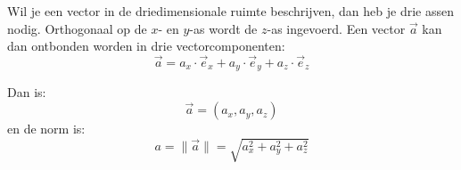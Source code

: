 \documentclass{ximera}
\begin{document}
\begin{remark}[expandable=true,title={Vectoren in drie dimensies}]\nl
    Wil je een vector in de driedimensionale ruimte beschrijven, dan heb je drie assen nodig. Orthogonaal op de $x$- en $y$-as wordt de $z$-as ingevoerd. Een vector $\vec{a}$ kan dan ontbonden worden in drie vectorcomponenten:
    \[ \vec{a} = a_{x} \cdot \vec{e}_{x} + a_{y} \cdot \vec{e}_{y} + a_{z} \cdot \vec{e}_{z} \] 
    
    Dan is:
    \[ \vec{a} = (a_{x}, a_{y}, a_{z}) \] 
    en de norm is: 
    \[ a = \| \vec{a} \| = \sqrt{a_{x}^{2} + a_{y}^{2} + a_{z}^{2}} \] 
\end{remark}
     
\end{document}
